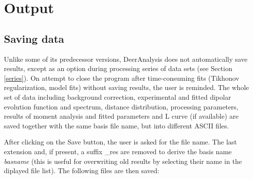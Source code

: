 \documentclass{article}
\begin{document}
\section{Output}
\subsection{Saving data}
\label{output}
Unlike some of its predecessor versions, DeerAnalysis does not automatically save results, except as an option during processing series of data sets (see Section \ref{series}). On attempt to close the program after time-consuming fits (Tikhonov regularization, model fits) without saving results, the user is reminded. The whole set of data including background correction, experimental and fitted dipolar evolution function and spectrum, distance distribution, processing parameters, results of moment analysis and fitted parameters and L curve (if available) are saved together with the same basis file name, but into different ASCII files. 

After clicking on the {\ttfamily Save} button, the user is asked for the file name. The last extension and, if present, a suffix {\ttfamily \_res} are removed to derive the basis name {\ttfamily \emph{basname}} (this is useful for overwriting old results by selecting their name in the diplayed file list). The following files are then saved:
\end{document}
